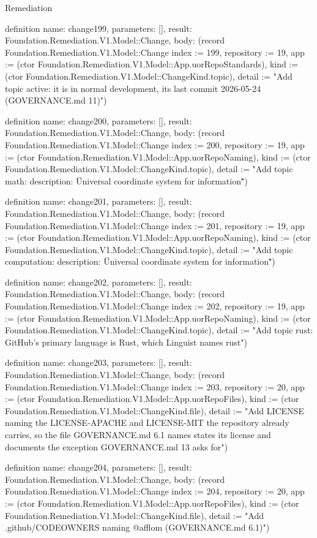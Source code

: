 \begin{lexlean}{Remediation}
\begin{semanticmodule}
definition{
  name: change199,
  parameters: [],
  result: Foundation.Remediation.V1.Model::Change,
  body: (record Foundation.Remediation.V1.Model::Change {index := 199, repository := 19, app := (ctor Foundation.Remediation.V1.Model::App.uorRepoStandards), kind := (ctor Foundation.Remediation.V1.Model::ChangeKind.topic), detail := "Add topic active: it is in normal development, its last commit 2026-05-24 (GOVERNANCE.md 11)"})
}

definition{
  name: change200,
  parameters: [],
  result: Foundation.Remediation.V1.Model::Change,
  body: (record Foundation.Remediation.V1.Model::Change {index := 200, repository := 19, app := (ctor Foundation.Remediation.V1.Model::App.uorRepoNaming), kind := (ctor Foundation.Remediation.V1.Model::ChangeKind.topic), detail := "Add topic math: description: \"Universal coordinate system for information\""})
}

definition{
  name: change201,
  parameters: [],
  result: Foundation.Remediation.V1.Model::Change,
  body: (record Foundation.Remediation.V1.Model::Change {index := 201, repository := 19, app := (ctor Foundation.Remediation.V1.Model::App.uorRepoNaming), kind := (ctor Foundation.Remediation.V1.Model::ChangeKind.topic), detail := "Add topic computation: description: \"Universal coordinate system for information\""})
}

definition{
  name: change202,
  parameters: [],
  result: Foundation.Remediation.V1.Model::Change,
  body: (record Foundation.Remediation.V1.Model::Change {index := 202, repository := 19, app := (ctor Foundation.Remediation.V1.Model::App.uorRepoNaming), kind := (ctor Foundation.Remediation.V1.Model::ChangeKind.topic), detail := "Add topic rust: GitHub's primary language is Rust, which Linguist names rust"})
}

definition{
  name: change203,
  parameters: [],
  result: Foundation.Remediation.V1.Model::Change,
  body: (record Foundation.Remediation.V1.Model::Change {index := 203, repository := 20, app := (ctor Foundation.Remediation.V1.Model::App.uorRepoFiles), kind := (ctor Foundation.Remediation.V1.Model::ChangeKind.file), detail := "Add LICENSE naming the LICENSE-APACHE and LICENSE-MIT the repository already carries, so the file GOVERNANCE.md 6.1 names states its license and documents the exception GOVERNANCE.md 13 asks for"})
}

definition{
  name: change204,
  parameters: [],
  result: Foundation.Remediation.V1.Model::Change,
  body: (record Foundation.Remediation.V1.Model::Change {index := 204, repository := 20, app := (ctor Foundation.Remediation.V1.Model::App.uorRepoFiles), kind := (ctor Foundation.Remediation.V1.Model::ChangeKind.file), detail := "Add .github/CODEOWNERS naming @afflom (GOVERNANCE.md 6.1)"})
}


\end{semanticmodule}
\end{lexlean}
